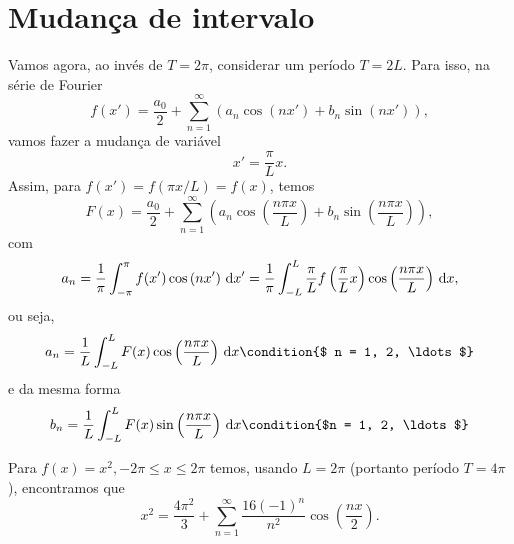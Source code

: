 \section{Mudança de intervalo}
Vamos agora, ao invés de $T = 2 \pi$, considerar um período $T = 2 L$. Para
isso, na série de Fourier
\begin{dmath*}
  f(x') = \frac{a_0}{2} + \sum_{n = 1}^\infty \left( a_n \cos\left( n x' \right)
  + b_n \sin\left( n x' \right) \right),
\end{dmath*}
vamos fazer a mudança de variável
\begin{dmath*}
  x' = \frac{\pi}{L} x.
\end{dmath*}
Assim, para $f(x') = f(\pi x / L) = f(x)$, temos
\begin{dmath*}
  F(x) = \frac{a_0}{2} + \sum_{n = 1}^\infty \left( a_n \cos\left( \frac{n \pi
  x}{L} \right) + b_n \sin\left( \frac{n \pi x}{L} \right) \right),
\end{dmath*}
com
\begin{dmath*}
  a_n = \frac{1}{\pi} \int_{-\pi}^\pi f(x') \cos\left( n x' \right) \vi{x'} =
  \frac{1}{\pi} \int_{-L}^L \frac{\pi}{L} f\left( \frac{\pi}{L} x \right)
  \cos\left( \frac{n \pi x}{L} \right) \vi{x},
\end{dmath*}
ou seja,
\begin{dmath*}
  a_n = \frac{1}{L} \int_{-L}^L F(x) \cos\left( \frac{n \pi x}{L} \right)
  \vi{x} \condition{$ n = 1, 2, \ldots$}
\end{dmath*}
e da mesma forma
\begin{dmath*}
  b_n = \frac{1}{L} \int_{-L}^L F(x) \sin\left( \frac{n \pi x}{L} \right)
  \vi{x} \condition{$n = 1, 2, \ldots$}
\end{dmath*}

\begin{exem}
  Para $f(x) = x^2, - 2 \pi \leq x \leq 2 \pi$ temos, usando $L = 2 \pi$
  (portanto período $T = 4\pi$), encontramos que
  \begin{dmath*}
    x^2 = \frac{4 \pi^2}{3} + \sum_{n = 1}^\infty \frac{16 (-1)^n}{n^2}
    \cos\left( \frac{n x}{2} \right).
  \end{dmath*}
\end{exem}

